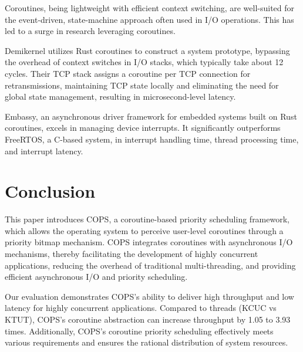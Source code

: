 \documentclass[conference]{IEEEtran}
\begin{document}
Coroutines, being lightweight with efficient context switching, are well-suited for the event-driven, state-machine approach often used in I/O operations. This has led to a surge in research leveraging coroutines.

Demikernel\cite{zhang_demikernel_2021} utilizes Rust coroutines to construct a system prototype, bypassing the overhead of context switches in I/O stacks, which typically take about 12 cycles. Their TCP stack assigns a coroutine per TCP connection for retransmissions, maintaining TCP state locally and eliminating the need for global state management, resulting in microsecond-level latency.

Embassy\cite{embassy}, an asynchronous driver framework for embedded systems built on Rust coroutines, excels in managing device interrupts. It significantly outperforms FreeRTOS, a C-based system, in interrupt handling time, thread processing time, and interrupt latency.

\section{Conclusion}
\label{section: Conclusion}

This paper introduces COPS, a coroutine-based priority scheduling framework, which allows the operating system to perceive user-level coroutines through a priority bitmap mechanism. COPS integrates coroutines with asynchronous I/O mechanisms, thereby facilitating the development of highly concurrent applications, reducing the overhead of traditional multi-threading, and providing efficient asynchronous I/O and priority scheduling.

Our evaluation demonstrates COPS's ability to deliver high throughput and low latency for highly concurrent applications. Compared to threads (KCUC vs KTUT), COPS's coroutine abstraction can increase throughput by 1.05 to 3.93 times. Additionally, COPS's coroutine priority scheduling effectively meets various requirements and ensures the rational distribution of system resources.



\end{document}
